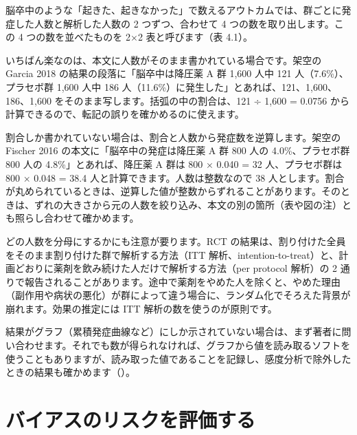 脳卒中のような「起きた、起きなかった」で数えるアウトカムでは、群ごとに発症した人数と解析した人数の 2 つずつ、合わせて 4 つの数を取り出します。この 4 つの数を並べたものを 2×2 表と呼びます（表 4.1）。

\begin{kkcenter}
\end{kkcenter}

いちばん楽なのは、本文に人数がそのまま書かれている場合です。架空の Garcia 2018 の結果の段落に「脳卒中は降圧薬 A 群 1,600 人中 121 人（7.6\%）、プラセボ群 1,600 人中 186 人（11.6\%）に発生した」とあれば、121、1,600、186、1,600 をそのまま写します。括弧の中の割合は、121 ÷ 1,600 = 0.0756 から計算できるので、転記の誤りを確かめるのに使えます。

割合しか書かれていない場合は、割合と人数から発症数を逆算します。架空の Fischer 2016 の本文に「脳卒中の発症は降圧薬 A 群 800 人の 4.0\%、プラセボ群 800 人の 4.8\%」とあれば、降圧薬 A 群は 800 × 0.040 = 32 人、プラセボ群は 800 × 0.048 = 38.4 人と計算できます。人数は整数なので 38 人とします。割合が丸められているときは、逆算した値が整数からずれることがあります。そのときは、ずれの大きさから元の人数を絞り込み、本文の別の箇所（表や図の注）とも照らし合わせて確かめます。

どの人数を分母にするかにも注意が要ります。RCT の結果は、割り付けた全員をそのまま割り付けた群で解析する方法（ITT 解析、intention-to-treat）と、計画どおりに薬剤を飲み続けた人だけで解析する方法（per protocol 解析）の 2 通りで報告されることがあります。途中で薬剤をやめた人を除くと、やめた理由（副作用や病状の悪化）が群によって違う場合に、ランダム化でそろえた背景が崩れます。効果の推定には ITT 解析の数を使うのが原則です。

結果がグラフ（累積発症曲線など）にしか示されていない場合は、まず著者に問い合わせます。それでも数が得られなければ、グラフから値を読み取るソフトを使うこともありますが、読み取った値であることを記録し、感度分析で除外したときの結果も確かめます（）。

\section{バイアスのリスクを評価する}
\label{sec:04-3}

